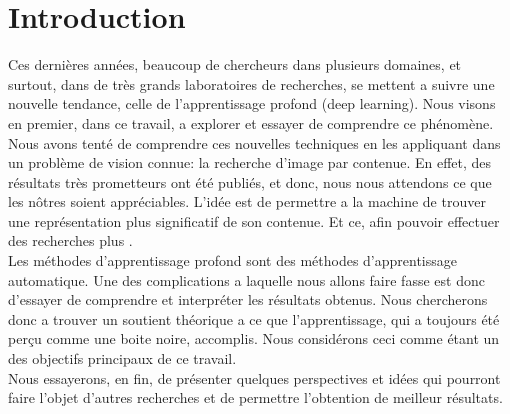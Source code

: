 
\chapter{Introduction} %

Ces dernières années, beaucoup de chercheurs dans plusieurs domaines, et surtout, dans de très grands laboratoires de recherches, se mettent a suivre une nouvelle tendance, celle de l'apprentissage profond (deep learning). Nous visons en premier, dans ce travail, a explorer et essayer de comprendre ce phénomène.\\

Nous avons tenté de comprendre ces nouvelles techniques en les appliquant dans un problème de vision connue: la recherche d'image par contenue. En effet, des résultats très prometteurs ont été publiés, et donc, nous nous attendons ce que les nôtres soient appréciables. L’idée est de permettre a la machine de trouver une représentation plus significatif de son contenue. Et ce, afin pouvoir effectuer des recherches plus .\\

Les méthodes d’apprentissage profond sont des méthodes d'apprentissage automatique. Une des complications a laquelle nous allons faire fasse est donc d'essayer de comprendre et interpréter les résultats obtenus. Nous chercherons donc a trouver un soutient théorique a ce que l'apprentissage, qui a toujours été perçu comme une boite noire, accomplis. Nous considérons ceci comme étant un des objectifs principaux de ce travail.\\

Nous essayerons, en fin, de présenter quelques perspectives et idées qui pourront faire l'objet d'autres recherches et de permettre l'obtention de meilleur résultats.